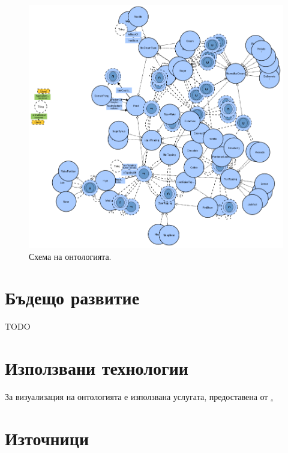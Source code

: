 \documentclass[12pt]{article}
\begin{document}
        \begin{figure}
        \centering
            \includegraphics[scale=0.5]{./images/viz1.png}
            \caption{Схема на онтологията.}
            \label{fig:viz1}
        \end{figure}



\section{Бъдещо развитие}

TODO




\section{Използвани технологии}

За визуализация на онтологията е използвана услугата, предоставена от \href{http://vowl.visualdataweb.org/webvowl-old/webvowl-old.html}.




\listoffigures

\section{Източници}
\end{document}
